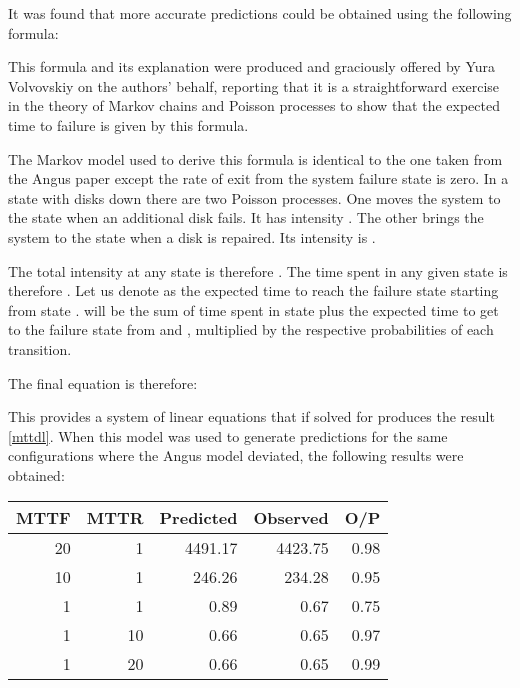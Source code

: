 \documentclass[XXX,endnotes]{usetex-v1}
\begin{document}
It was found that more accurate predictions could be obtained using the following formula:



This formula and its explanation were produced and graciously offered by Yura Volvovskiy on the authors' behalf, reporting that it is a straightforward exercise in the theory of Markov chains and Poisson processes to show that the expected time to failure is given by this formula.

The Markov model used to derive this formula is identical to the one taken from the Angus paper except the rate of exit from the system failure state is zero.  In a state with  disks down there are two Poisson processes.  One moves the system to the state  when an additional disk fails.  It has intensity .  The other brings the system to the state  when a disk is repaired. Its intensity is .

The total intensity at any state  is therefore .  The time spent in any given state is therefore .  Let us denote  as the expected time to reach the failure state starting from state .   will be the sum of time spent in state  plus the expected time to get to the failure state from  and , multiplied by the respective probabilities of each transition. 

The final equation is therefore:




This provides a system of linear equations that if solved for  produces the result \eqref{mttdl}.  When this model was used to generate predictions for the same configurations where the Angus model deviated, the following results were obtained:

\begin{center}
  \begin{tabular}{ | r | r | r | r | r | }
    \hline
      MTTF       & MTTR     & Predicted    & Observed  & O/P        \\ \hline
      20         & 1        & 4491.17      & 4423.75   & 0.98       \\ \hline
      10         & 1        & 246.26       & 234.28    & 0.95       \\ \hline
      1          & 1        & 0.89         & 0.67      & 0.75       \\ \hline
      1          & 10       & 0.66         & 0.65      & 0.97       \\ \hline
      1          & 20       & 0.66         & 0.65      & 0.99       \\ \hline
  \end{tabular}
\end{center}
\end{document}
